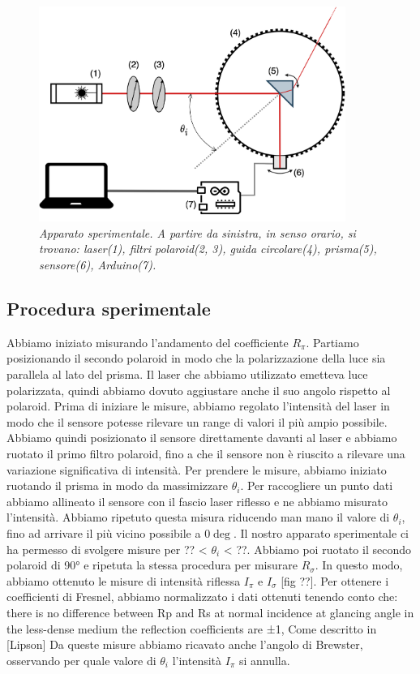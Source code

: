 \documentclass[12pt, a4paper, twoside]{article}
\begin{document}
    \begin{figure}[h]
      \centering
      \includegraphics[width=10cm]{instrumental-apparatus.png}
      \caption{
        \emph{
          Apparato sperimentale. A partire da sinistra, in senso orario,
          si trovano: laser(1), filtri polaroid(2, 3), guida circolare(4),
          prisma(5), sensore(6), Arduino(7).
        }
      }
      \label{fig:instrumental-apparatus}
    \end{figure}

  \subsection{Procedura sperimentale}\label{subsec:procedura-sperimentale}
    Abbiamo iniziato misurando l’andamento del coefficiente $R_\pi$. Partiamo posizionando il secondo polaroid in modo che la polarizzazione della luce sia parallela al lato del prisma. Il laser che abbiamo utilizzato emetteva luce polarizzata, quindi abbiamo dovuto aggiustare anche il suo angolo rispetto al polaroid. Prima di iniziare le misure, abbiamo regolato l’intensità del laser in modo che il sensore potesse rilevare un range di valori il più ampio possibile. Abbiamo quindi posizionato il sensore direttamente davanti al laser e abbiamo ruotato il primo filtro polaroid, fino a che il sensore non è riuscito a rilevare una variazione significativa di intensità.
    Per prendere le misure, abbiamo iniziato ruotando il prisma in modo da massimizzare $\theta_i$. Per raccogliere un
    punto dati abbiamo allineato il sensore con il fascio laser riflesso e ne abbiamo misurato l’intensità. Abbiamo
    ripetuto questa misura riducendo man mano il valore di $\theta_i$, fino ad arrivare il più vicino possibile a $0\deg$.
    Il nostro apparato sperimentale ci ha permesso di svolgere misure per ?? < $\theta_i$ < ??.
    Abbiamo poi ruotato il secondo polaroid di 90° e ripetuta la stessa procedura per misurare $R_\sigma$.
    In questo modo, abbiamo ottenuto le misure di intensità riflessa $I_\pi$ e $I_\sigma$ [fig ??]. Per ottenere i
    coefficienti di Fresnel, abbiamo normalizzato i dati ottenuti tenendo conto che:
    there is no difference between Rp and Rs at normal incidence
    at glancing angle in the less-dense medium the reflection coefficients are ±1,
    Come descritto in [Lipson]
    Da queste misure abbiamo ricavato anche l’angolo di Brewster, osservando per quale valore di $\theta_i$
    l’intensità $I_\pi$ si annulla.
\end{document}
